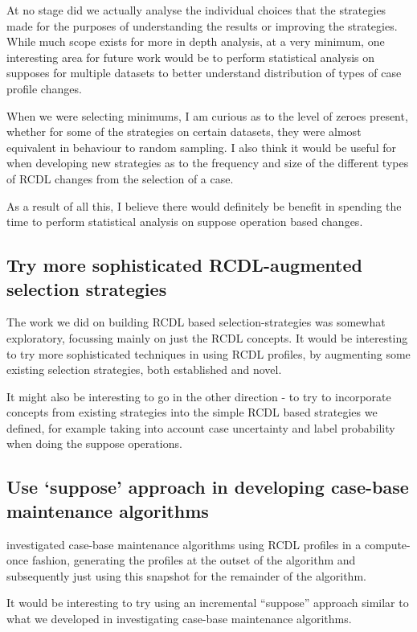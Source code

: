 \documentclass[a4paper,11pt]{report}
\begin{document}
At no stage did we actually analyse the individual choices that the strategies made for the purposes of understanding the results or improving the strategies. While much scope exists for more in depth analysis, at a very minimum, one interesting area for future work would be to perform statistical analysis on supposes for multiple datasets to better understand distribution of types of case profile changes.

When we were selecting minimums, I am curious as to the level of zeroes present, whether for some of the strategies on certain datasets, they were almost equivalent in behaviour to random sampling. I also think it would be useful for when developing new strategies as to the frequency and size of the different types of RCDL changes from the selection of a case.

As a result of all this, I believe there would definitely be benefit in spending the time to perform statistical analysis on suppose operation based changes.

\subsection{Try more sophisticated RCDL-augmented selection strategies}

The work we did on building RCDL based selection-strategies was somewhat exploratory, focussing mainly on just the RCDL concepts. It would be interesting to try more sophisticated techniques in using RCDL profiles, by augmenting some existing selection strategies, both established and novel.

It might also be interesting to go in the other direction - to try to incorporate concepts from existing strategies into the simple RCDL based strategies we defined, for example taking into account case uncertainty and label probability when doing the suppose operations.

\subsection{Use `suppose' approach in developing case-base maintenance algorithms}

\citet{Delany2009} investigated case-base maintenance algorithms using RCDL profiles in a compute-once fashion, generating the profiles at the outset of the algorithm and subsequently just using this snapshot for the remainder of the algorithm.

It would be interesting to try using an incremental  ``suppose'' approach similar to what we developed in investigating case-base maintenance algorithms.
\end{document}
